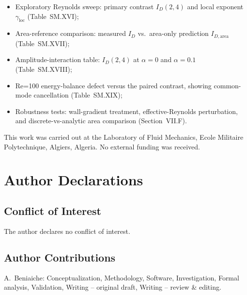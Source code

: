 \documentclass[aip,pof,reprint]{revtex4-2}
\begin{document}
\begin{itemize}
\item Exploratory Reynolds sweep: primary contrast $I_D(2,4)$ and local exponent $\gamma_{\mathrm{loc}}$ (Table~SM.XVI);
\item Area-reference comparison: measured $I_D$ vs.\ area-only prediction $I_{D,\mathrm{area}}$ (Table~SM.XVII);
\item Amplitude-interaction table: $I_D(2,4)$ at $\alpha=0$ and $\alpha=0.1$ (Table~SM.XVIII);
\item Re=100 energy-balance defect versus the paired contrast, showing common-mode cancellation (Table~SM.XIX);
\item Robustness tests: wall-gradient treatment, effective-Reynolds perturbation, and discrete-vs-analytic area comparison (Section~VII.F).
\end{itemize}

\begin{acknowledgments}
\par\vspace{0.5ex}
This work was carried out at the Laboratory of Fluid Mechanics, Ecole Militaire Polytechnique, Algiers, Algeria. No external funding was received.
\end{acknowledgments}

\section*{Author Declarations}
\subsection*{Conflict of Interest}
The author declares no conflict of interest.
\subsection*{Author Contributions}
A.~Beniaiche: Conceptualization, Methodology, Software, Investigation, Formal analysis, Validation, Writing -- original draft, Writing -- review \& editing.
\end{document}
